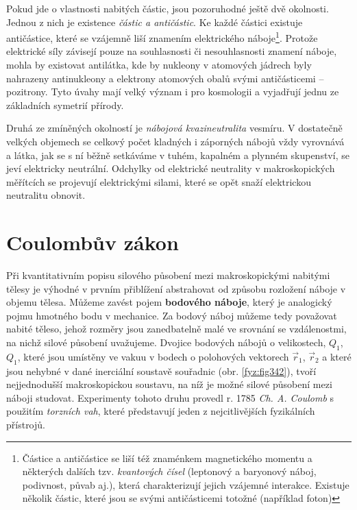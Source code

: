 {  Pokud jde o vlastnosti nabitých částic, jsou pozoruhodné ještě dvě okolnosti. Jednou z nich je 
  existence \emph{částic a antičástic}. Ke každé částici existuje antičástice, které se vzájemně 
  liší znamením elektrického náboje\footnote{Částice a antičástice se liší též znaménkem
  magnetického momentu a některých dalších tzv. \emph{kvantových čísel} (leptonový a  baryonový 
  náboj, podivnost, půvab aj.), která charakterizují jejich vzájemné interakce. Existuje několik 
  částic, které jsou se svými antičásticemi totožné (například foton)}. Protože elektrické síly 
  závisejí pouze na souhlasnosti či nesouhlasnosti znamení náboje, mohla by existovat antilátka, 
  kde by nukleony v atomových jádrech byly nahrazeny antinukleony a elektrony atomových obalů svými 
  antičásticemi – pozitrony. Tyto úvahy mají velký význam i pro kosmologii a vyjadřují jednu ze 
  základních symetrií přírody.
  
  Druhá ze zmíněných okolností je \emph{nábojová kvazineutralita} vesmíru. V dostatečně velkých 
  objemech se celkový počet kladných i záporných nábojů vždy vyrovnává a látka, jak se s ní běžně 
  setkáváme v tuhém, kapalném a plynném skupenství, se jeví elektricky neutrální. Odchylky od 
  elektrické neutrality v makroskopických měřítcích se projevují elektrickými silami, které se opět 
  snaží elektrickou neutralitu obnovit.
  
\section{Coulombův zákon}\label{fyz:IIIchapIsecII}
  Při kvantitativním popisu silového působení mezi makroskopickými nabitými tělesy je výhodné v 
  prvním přiblížení abstrahovat od způsobu rozložení náboje v objemu tělesa. Můžeme zavést pojem 
  \textbf{bodového náboje}, který je analogický pojmu hmotného bodu v mechanice. Za bodový náboj 
  můžeme tedy považovat nabité těleso, jehož rozměry jsou zanedbatelně malé ve srovnání se 
  vzdálenostmi, na nichž silové působení uvažujeme. Dvojice bodových nábojů o velikostech, 
  \(Q_1\), \(Q_1\), které jsou umístěny ve vakuu v bodech o polohových vektorech \(\vec{r}_1\), 
  \(\vec{r}_2\) a které jsou nehybné v dané inerciální soustavě souřadnic (obr. \ref{fyz:fig342}), 
  tvoří nejjednodušší makroskopickou soustavu, na níž je možné silové působení mezi náboji 
  studovat. Experimenty tohoto druhu provedl r. 1785 \emph{Ch. A. Coulomb} s použitím 
  \emph{torzních vah}, které představují jeden z nejcitlivějších fyzikálních přístrojů. 

}
